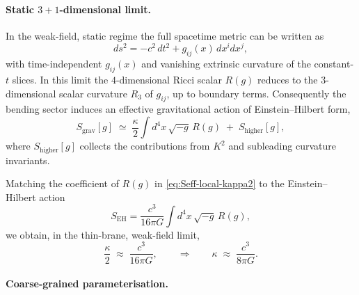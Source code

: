 \paragraph{Static $3+1$-dimensional limit.}

In the weak-field, static regime the full spacetime metric can be written as
%
\begin{equation}
  ds^2 = -c^2\,dt^2 + g_{ij}(x)\,dx^i dx^j,
\end{equation}
%
with time-independent $g_{ij}(x)$ and vanishing extrinsic curvature of the
constant-$t$ slices.
In this limit the $4$-dimensional Ricci scalar $R(g)$
reduces to the $3$-dimensional scalar curvature $R_3$ of $g_{ij}$, up to
boundary terms.
Consequently the bending sector induces an effective gravitational action
of Einstein--Hilbert form,
%
\begin{equation}
  S_{\mathrm{grav}}[g]
  \;\simeq\;
  \frac{\kappa}{2}
  \int d^4x\,\sqrt{-g}\,R(g)
  \;+\; S_\text{higher}[g],
  \label{eq:Seff-local-kappa2}
\end{equation}
%
where $S_\text{higher}[g]$ collects the contributions from $K^2$ and
subleading curvature invariants.

Matching the coefficient of $R(g)$ in \eqref{eq:Seff-local-kappa2}
to the Einstein--Hilbert action
%
\begin{equation}
  S_{\mathrm{EH}}
  = \frac{c^3}{16\pi G} \int d^4x\,\sqrt{-g}\,R(g),
\end{equation}
%
we obtain, in the thin-brane, weak-field limit,
%
\begin{equation}
  \frac{\kappa}{2} \;\approx\; \frac{c^3}{16\pi G},
  \qquad\Rightarrow\qquad
  \kappa \;\approx\; \frac{c^3}{8\pi G}.
  \label{eq:kappa-from-G}
\end{equation}

\paragraph{Coarse-grained parameterisation.}

